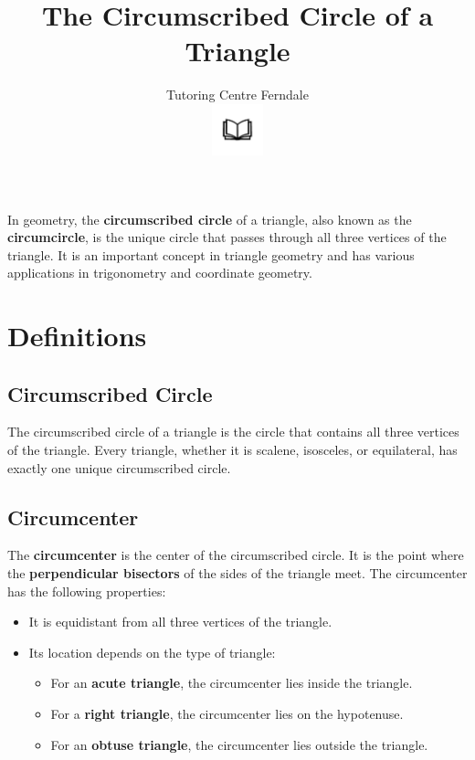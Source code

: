 \documentclass[12pt,a4paper]{article}
\title{The Circumscribed Circle of a Triangle}
\author{Tutoring Centre Ferndale\\
\includegraphics[width=4em]{ApS_logo.png}}
\date{}
\begin{document}
\maketitle

In geometry, the \textbf{circumscribed circle} of a triangle, also known as the \textbf{circumcircle}, is the unique circle that passes through all three vertices of the triangle. It is an important concept in triangle geometry and has various applications in trigonometry and coordinate geometry.

\section*{Definitions}

\subsection*{Circumscribed Circle}
The circumscribed circle of a triangle is the circle that contains all three vertices of the triangle. Every triangle, whether it is scalene, isosceles, or equilateral, has exactly one unique circumscribed circle.

\begin{center}
\end{center}

\newpage

\subsection*{Circumcenter}
The \textbf{circumcenter} is the center of the circumscribed circle. It is the point where the \textbf{perpendicular bisectors} of the sides of the triangle meet. The circumcenter has the following properties:
\begin{itemize}
    \item It is equidistant from all three vertices of the triangle.
    \item Its location depends on the type of triangle:
    \begin{itemize}
        \item For an \textbf{acute triangle}, the circumcenter lies inside the triangle.
        \item For a \textbf{right triangle}, the circumcenter lies on the hypotenuse.
        \item For an \textbf{obtuse triangle}, the circumcenter lies outside the triangle.
    \end{itemize}
\end{itemize}
\end{document}
